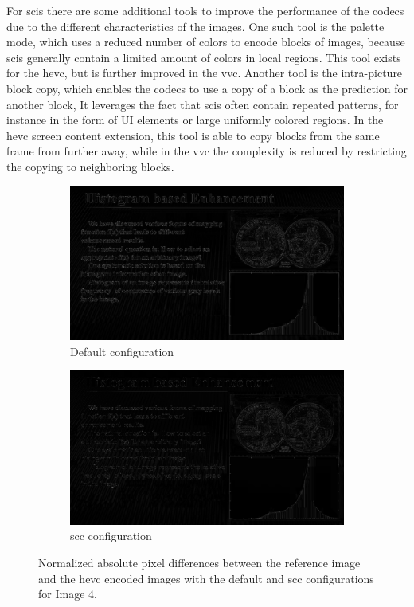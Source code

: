 For \glspl{sci} there are some additional tools \cite{vvc_2021} to improve the performance of the codecs due to the different characteristics of the images.
One such tool is the palette mode, which uses a reduced number of colors to encode blocks of images, because \glspl{sci} generally contain a limited amount of colors in local regions.
This tool exists for the \gls{hevc}, but is further improved in the \gls{vvc}.
Another tool is the intra-picture block copy, which enables the codecs to use a copy of a block as the prediction for another block,
It leverages the fact that \glspl{sci} often contain repeated patterns, for instance in the form of UI elements or large uniformly colored regions.
In the \gls{hevc} screen content extension, this tool is able to copy blocks from the same frame from further away, while in the \gls{vvc} the complexity is reduced by restricting the copying to neighboring blocks.
\begin{figure}
    \centering
    \begin{subfigure}[b]{0.45\textwidth}
        \includegraphics[width=\linewidth]{../images/codec_hm_default_diff_50_SCI4.png}
        \caption{Default configuration}
        \label{fig:codec_hm_default_diff_50_SCI4}
    \end{subfigure}
    \hfill
    \begin{subfigure}[b]{0.45\textwidth}
        \includegraphics[width=\linewidth]{../images/codec_hm_scc_diff_50_SCI4.png}
        \caption{\gls{scc} configuration}
        \label{fig:codec_hm_scc_diff_50_SCI4}
    \end{subfigure}
    \caption{Normalized absolute pixel differences between the reference image and the \gls{hevc} encoded images with the default and \gls{scc} configurations for Image 4.}
    \label{fig:codec_hm_diff_50_SCI4}
\end{figure}
